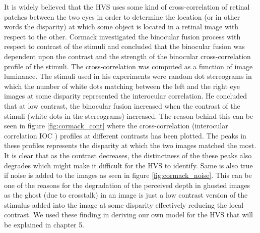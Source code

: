 It is widely believed that the HVS uses some kind of cross-correlation of retinal patches between the two eyes in order to determine the location (or in other words the disparity) at which some object is located in a retinal image with respect to the other. Cormack \cite{cormack1991interocular} investigated the binocular fusion process with respect to contrast of the stimuli and concluded that the binocular fusion was dependent upon the contrast and the strength of the binocular cross-correlation profile of the stimuli. The cross-correlation was computed as a function of image luminance. The stimuli used in his experiments were random dot stereograms in which the number of white dots matching between the left and the right eye images at some disparity represented the interocular correlation. He concluded that at low contrast, the binocular fusion increased when the contrast of the stimuli (white dots in the stereograms) increased. The reason behind this can be seen in figure \ref{fig:cormack_cont} where the cross-correlation (interocular correlation IOC ) profiles at different contrasts has been plotted. The peaks in these profiles represents the disparity at which the two images matched the most. It is clear that as the contrast decreases, the distinctness of the these peaks also degrades which might make it difficult for the HVS to identify. Same is also true if noise is added to the images as seen in figure \ref{fig:cormack_noise}. This can be one of the reasons for the degradation of the perceived depth in ghosted images as the ghost (due to crosstalk) in an image is just a low contrast version of the stimulus added into the image at some disparity effectively reducing the local contrast. We used these finding in deriving our own model for the HVS that will be explained in chapter 5.

